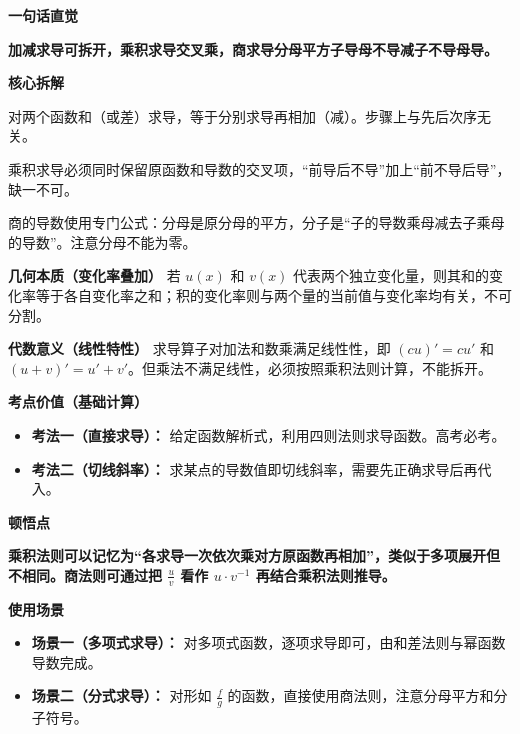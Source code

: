 \begin{explanationbox}

	\textbf{\textcolor{CExplanation}{一句话直觉}}

	\textbf{加减求导可拆开，乘积求导交叉乘，商求导分母平方子导母不导减子不导母导。}

	\medskip
	\textbf{\textcolor{CExplanation}{核心拆解}}
	\begin{description}[style=nextline, leftmargin=2.8em, labelsep=0.5em, itemsep=0.45em]
		\item[\textbf{要点一（和差法则）：}] 对两个函数和（或差）求导，等于分别求导再相加（减）。步骤上与先后次序无关。
		\item[\textbf{要点二（乘积法则）：}] 乘积求导必须同时保留原函数和导数的交叉项，“前导后不导”加上“前不导后导”，缺一不可。
		\item[\textbf{要点三（商法则）：}] 商的导数使用专门公式：分母是原分母的平方，分子是“子的导数乘母减去子乘母的导数”。注意分母不能为零。
	\end{description}

	\medskip
	\textbf{\textcolor{CExplanation}{几何本质（变化率叠加）}}
	若 $u(x)$ 和 $v(x)$ 代表两个独立变化量，则其和的变化率等于各自变化率之和；积的变化率则与两个量的当前值与变化率均有关，不可分割。

	\medskip
	\textbf{\textcolor{CExplanation}{代数意义（线性特性）}}
	求导算子对加法和数乘满足线性性，即 $(cu)'=cu'$ 和 $(u+v)'=u'+v'$。但乘法不满足线性，必须按照乘积法则计算，不能拆开。

	\medskip
	\textbf{\textcolor{CExplanation}{考点价值（基础计算）}}
	\begin{itemize}[leftmargin=*, itemsep=0.5em, topsep=0.4em]
		\item \textbf{考法一（直接求导）：} 给定函数解析式，利用四则法则求导函数。高考必考。
		\item \textbf{考法二（切线斜率）：} 求某点的导数值即切线斜率，需要先正确求导后再代入。
	\end{itemize}

	\medskip
	\textbf{\textcolor{CExplanation}{顿悟点}}

	\textbf{乘积法则可以记忆为“各求导一次依次乘对方原函数再相加”，类似于多项展开但不相同。商法则可通过把 $\frac{u}{v}$ 看作 $u \cdot v^{-1}$ 再结合乘积法则推导。}

	\medskip
	\textbf{\textcolor{CExplanation}{使用场景}}
	\begin{itemize}[leftmargin=*, itemsep=0.5em, topsep=0.4em]
		\item \textbf{场景一（多项式求导）：} 对多项式函数，逐项求导即可，由和差法则与幂函数导数完成。
		\item \textbf{场景二（分式求导）：} 对形如 $\frac{f}{g}$ 的函数，直接使用商法则，注意分母平方和分子符号。
	\end{itemize}
\end{explanationbox}
